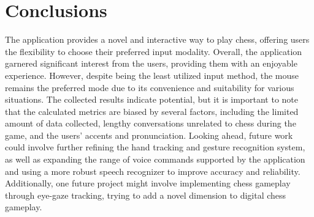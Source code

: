 \documentclass[a4paper, 11pt, twocolumn]{IEEEtran}
\begin{document}
    \section{Conclusions} The application provides a novel and interactive way to play chess, offering users the flexibility to choose their preferred input modality. Overall, the application garnered significant interest from the users, providing them with an enjoyable experience. However, despite being the least utilized input method, the mouse remains the preferred mode due to its convenience and suitability for various situations. The collected results indicate potential, but it is important to note that the calculated metrics are biased by several factors, including the limited amount of data collected, lengthy conversations unrelated to chess during the game, and the users' accents and pronunciation. Looking ahead, future work could involve further refining the hand tracking and gesture recognition system, as well as expanding the range of voice commands supported by the application and using a more robust speech recognizer to improve accuracy and reliability. Additionally, one future project might involve implementing chess gameplay through eye-gaze tracking, trying to add a novel dimension to digital chess gameplay. 
\end{document}
